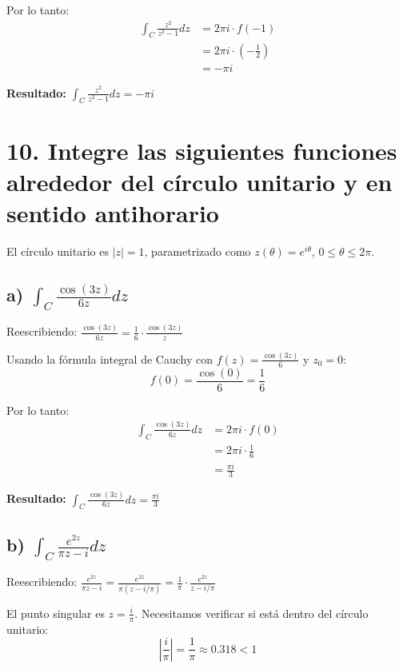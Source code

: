 \documentclass{article}
\begin{document}
Por lo tanto:
\begin{align*}
\int_C \frac{z^2}{z^2 - 1} dz &= 2\pi i \cdot f(-1) \\
                              &= 2\pi i \cdot \left(-\frac{1}{2}\right) \\
                              &= -\pi i
\end{align*}

\textbf{Resultado:} $\int_C \frac{z^2}{z^2 - 1} dz = -\pi i$

\newpage
\section*{10. Integre las siguientes funciones alrededor del círculo unitario y en sentido antihorario}

El círculo unitario es $|z| = 1$, parametrizado como $z(\theta) = e^{i\theta}$, $0 \leq \theta \leq 2\pi$.

\subsection*{a) $\int_C \frac{\cos(3z)}{6z} dz$}

Reescribiendo: $\frac{\cos(3z)}{6z} = \frac{1}{6} \cdot \frac{\cos(3z)}{z}$

Usando la fórmula integral de Cauchy con $f(z) = \frac{\cos(3z)}{6}$ y $z_0 = 0$:
$$f(0) = \frac{\cos(0)}{6} = \frac{1}{6}$$

Por lo tanto:
\begin{align*}
\int_C \frac{\cos(3z)}{6z} dz &= 2\pi i \cdot f(0) \\
                              &= 2\pi i \cdot \frac{1}{6} \\
                              &= \frac{\pi i}{3}
\end{align*}

\textbf{Resultado:} $\int_C \frac{\cos(3z)}{6z} dz = \frac{\pi i}{3}$

\subsection*{b) $\int_C \frac{e^{2z}}{\pi z - i} dz$}

Reescribiendo: $\frac{e^{2z}}{\pi z - i} = \frac{e^{2z}}{\pi(z - i/\pi)} = \frac{1}{\pi} \cdot \frac{e^{2z}}{z - i/\pi}$

El punto singular es $z = \frac{i}{\pi}$. Necesitamos verificar si está dentro del círculo unitario:
$$\left|\frac{i}{\pi}\right| = \frac{1}{\pi} \approx 0.318 < 1$$
\end{document}
